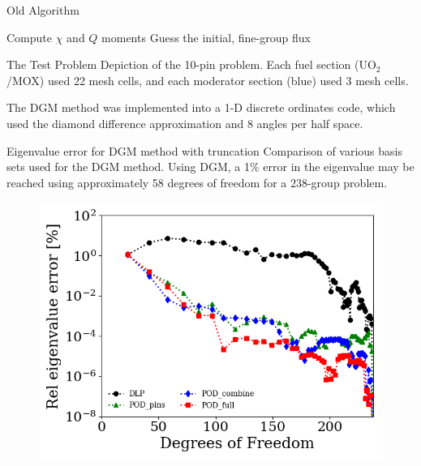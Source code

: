 \documentclass[final]{beamer}
\begin{document}
\begin{frame}{}
\begin{columns}[t]
        \begin{column}{0.32\linewidth}
            \begin{block}{Old Algorithm}
                \DontPrintSemicolon
                \begin{algorithm}[H]
                    Compute $\chi$ and $Q$ moments\;
                    Guess the initial, fine-group flux\;
                \end{algorithm}
            \end{block}
            \vspace{0.55eX}
            \begin{block}{The Test Problem}
                Depiction of the 10-pin problem. 
                Each fuel section (UO$_2$/MOX) used 22 mesh cells, and each moderator section (blue) used 3 mesh cells.
                \begin{figure}[htb]
                    
                \end{figure}
                The DGM method was implemented into a 1-D discrete ordinates code, which used the diamond difference approximation and 8 angles per half space.
            \end{block}
            \vspace{0.55eX}
            \begin{block}{Eigenvalue error for DGM method with truncation}
                Comparison of various basis sets used for the DGM method.
                Using DGM, a 1\% error in the eigenvalue may be reached using approximately 58 degrees of freedom for a 238-group problem.
                \begin{figure}[H]
                    \includegraphics[scale=1.0, width=0.9\columnwidth]{k_error_238_h0}

\end{figure}
\end{block}
\end{column}
\end{columns}
\end{frame}
\end{document}
